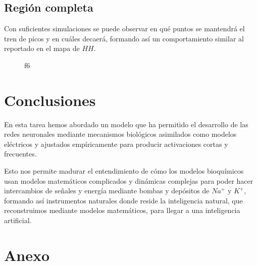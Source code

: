 \documentclass[11pt]{article}
\begin{document}
    \subsection{Región completa}\label{regiuxf3n-completa}

Con suficientes simulaciones se puede observar en qué puntos se
mantendrá el tren de picos y en cuáles decaerá, formando así un
comportamiento similar al reportado en el mapa de \(HH\).

    \begin{figure}
\centering
{}
\caption{f6}
\end{figure}

    \section{Conclusiones}\label{conclusiones}

En esta tarea hemos abordado un modelo que ha permitido el desarrollo de
las redes neuronales mediante mecanismos biológicos asimilados como
modelos eléctricos y ajustados empíricamente para producir activaciones
cortas y frecuentes.

Esto nos permite madurar el entendimiento de cómo los modelos
bioquímicos usan modelos matemáticos complicados y dinámicas complejas
para poder hacer intercambios de señales y energía mediante bombas y
depósitos de \(Na^+\) y \(K^+\), formando así instrumentos naturales
donde reside la inteligencia natural, que reconstruimos mediante modelos
matemáticos, para llegar a una inteligencia artificial.

    \section{Anexo}\label{anexo}
\end{document}
